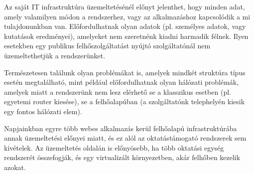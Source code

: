 Az saját IT infrastruktúra üzemeltetésénél előnyt jelenthet, hogy minden adat, amely valamilyen módon a rendszerhez, vagy az alkalmazáshoz kapcsolódik a mi tulajdonunkban van. Előfordulhatnak olyan adatok (pl. személyes adatok, vagy kutatások eredményei), amelyeket nem szeretnénk kiadni harmadik félnek. Ilyen esetekben egy publikus felhőszolgáltatást nyújtó szolgáltatónál nem üzemeltethetjük a rendszerünket.

Természetesen találunk olyan problémákat is, amelyek mindkét struktúra típus esetén megtalálható, mint például előfordulhatnak olyan hálózati problémák, amelyek miatt a rendszerünk nem lesz elérhető se a klasszikus esetben (pl. egyetemi router kiesése), se a felhőalapúban (a szolgáltatónk telephelyén kiesik egy fontos hálózati elem).

Napjainkban egyre több webes alkalmazás kerül felhőalapú infrastruktúrába annak üzemeltetési előnyei miatt, és ez alól az oktatástámogató rendszerek sem kivételek. Az üzemeltetés oldalán is előnyösebb, ha több oktatási egység rendszerét összefogják, és egy virtualizált környezetben, akár felhőben kezelik azokat.